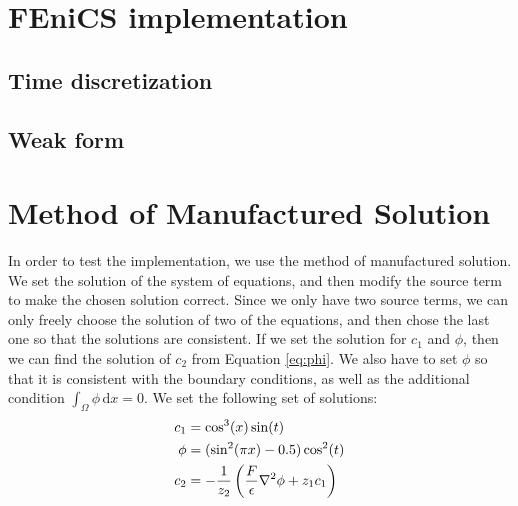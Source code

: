 \documentclass[12pt]{article}
\begin{document}
\section{FEniCS implementation}

\subsection{Time discretization}

\subsection{Weak form}

\section{Method of Manufactured Solution}
In order to test the implementation, we use the method of manufactured solution. We set the solution of the system of equations, and then modify the source term to make the chosen solution correct. Since we only have two source terms, we can only freely choose the solution of two of the equations, and then chose the last one so that the solutions are consistent. If we set the solution for $c_1$ and $\phi$, then we can find the solution of $c_2$ from Equation \eqref{eq:phi}. We also have to set $\phi$ so that it is consistent with the boundary conditions, as well as the additional condition $\int_\Omega \phi\, \text{d}x = 0$. We set the following set of solutions:
\begin{align}
c_1 &= \cos^3(x) \sin(t) \\ 
\phi &= (\sin^2(\pi x) - 0.5)\cos^2(t) \\
c_2 & = -{1\over z_2} \left( {F \over \epsilon}\nabla^2\phi + z_1c_1\right)
\end{align}
\end{document}
